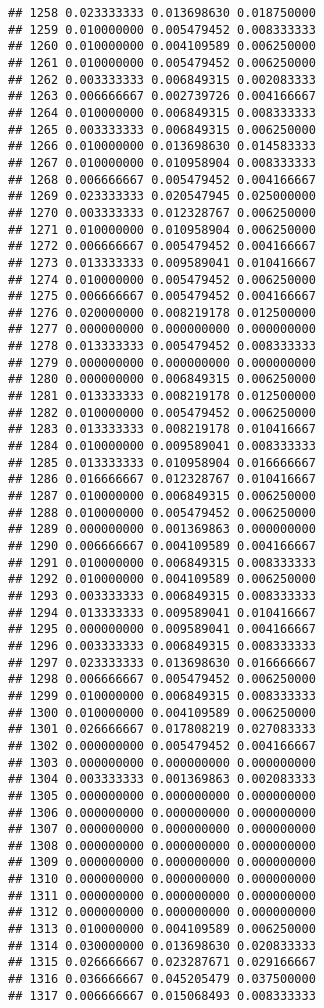 \documentclass[
]{article}
\begin{document}
\begin{verbatim}
## 1258 0.023333333 0.013698630 0.018750000
## 1259 0.010000000 0.005479452 0.008333333
## 1260 0.010000000 0.004109589 0.006250000
## 1261 0.010000000 0.005479452 0.006250000
## 1262 0.003333333 0.006849315 0.002083333
## 1263 0.006666667 0.002739726 0.004166667
## 1264 0.010000000 0.006849315 0.008333333
## 1265 0.003333333 0.006849315 0.006250000
## 1266 0.010000000 0.013698630 0.014583333
## 1267 0.010000000 0.010958904 0.008333333
## 1268 0.006666667 0.005479452 0.004166667
## 1269 0.023333333 0.020547945 0.025000000
## 1270 0.003333333 0.012328767 0.006250000
## 1271 0.010000000 0.010958904 0.006250000
## 1272 0.006666667 0.005479452 0.004166667
## 1273 0.013333333 0.009589041 0.010416667
## 1274 0.010000000 0.005479452 0.006250000
## 1275 0.006666667 0.005479452 0.004166667
## 1276 0.020000000 0.008219178 0.012500000
## 1277 0.000000000 0.000000000 0.000000000
## 1278 0.013333333 0.005479452 0.008333333
## 1279 0.000000000 0.000000000 0.000000000
## 1280 0.000000000 0.006849315 0.006250000
## 1281 0.013333333 0.008219178 0.012500000
## 1282 0.010000000 0.005479452 0.006250000
## 1283 0.013333333 0.008219178 0.010416667
## 1284 0.010000000 0.009589041 0.008333333
## 1285 0.013333333 0.010958904 0.016666667
## 1286 0.016666667 0.012328767 0.010416667
## 1287 0.010000000 0.006849315 0.006250000
## 1288 0.010000000 0.005479452 0.006250000
## 1289 0.000000000 0.001369863 0.000000000
## 1290 0.006666667 0.004109589 0.004166667
## 1291 0.010000000 0.006849315 0.008333333
## 1292 0.010000000 0.004109589 0.006250000
## 1293 0.003333333 0.006849315 0.008333333
## 1294 0.013333333 0.009589041 0.010416667
## 1295 0.000000000 0.009589041 0.004166667
## 1296 0.003333333 0.006849315 0.008333333
## 1297 0.023333333 0.013698630 0.016666667
## 1298 0.006666667 0.005479452 0.006250000
## 1299 0.010000000 0.006849315 0.008333333
## 1300 0.010000000 0.004109589 0.006250000
## 1301 0.026666667 0.017808219 0.027083333
## 1302 0.000000000 0.005479452 0.004166667
## 1303 0.000000000 0.000000000 0.000000000
## 1304 0.003333333 0.001369863 0.002083333
## 1305 0.000000000 0.000000000 0.000000000
## 1306 0.000000000 0.000000000 0.000000000
## 1307 0.000000000 0.000000000 0.000000000
## 1308 0.000000000 0.000000000 0.000000000
## 1309 0.000000000 0.000000000 0.000000000
## 1310 0.000000000 0.000000000 0.000000000
## 1311 0.000000000 0.000000000 0.000000000
## 1312 0.000000000 0.000000000 0.000000000
## 1313 0.010000000 0.004109589 0.006250000
## 1314 0.030000000 0.013698630 0.020833333
## 1315 0.026666667 0.023287671 0.029166667
## 1316 0.036666667 0.045205479 0.037500000
## 1317 0.006666667 0.015068493 0.008333333

\end{verbatim}
\end{document}
